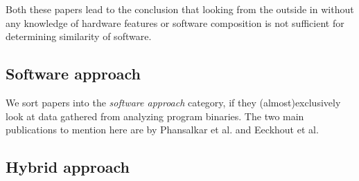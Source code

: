 \documentclass[../bachelor_paper.tex]{subfiles}
\begin{document}
Both these papers lead to the conclusion that looking from the outside in without any knowledge of hardware features or software composition is not sufficient for determining similarity of software.

\subsection{Software approach}
	\label{ch:theory/similarity/software}
We sort papers into the \emph{software approach} category, if they (almost)exclusively look at data gathered from analyzing program binaries. The two main publications to mention here are by Phansalkar et al. \cite{phansalkarMeasuringProgramSimilarity2005} and Eeckhout et al. \cite{eeckhoutDesigningComputerArchitecture2003}

\subsection{Hybrid approach}
	\label{ch:theory/similarity/hybrid}



\isstandalone



\fi
\end{document}
